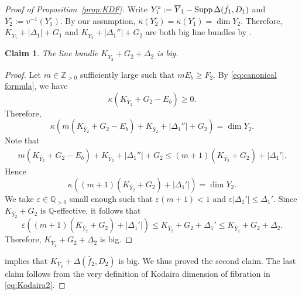 \documentclass[11pt,english]{smfart}
\theoremstyle{plain}
\newtheorem{claim}[thm]{Claim}
\theoremstyle{definition}
\theoremstyle{remark}
\numberwithin{equation}{subsection}
\theoremstyle{plain}
\def\ep{\varepsilon}
\newcommand{\bQ}{\mathbb{Q}}
\newcommand{\bZ}{\mathbb{Z}}
\begin{document}
\begin{proof}[Proof of Proposition~\ref{prop:KDF}]
 Write $Y_1^\circ:=\overline{Y}_1-{\rm Supp}\, \Delta(\bar{f}_1,D_1)$ and $Y_2^\circ:=v^{-1}(Y_1^\circ)$.  By our assumption, $\bar{\kappa}(Y_2^\circ)=\bar{\kappa}(Y_1^\circ)=\dim Y_2$.  Therefore, 
 $
K_{\overline{Y}_1}+|\Delta_1|+G_1
$  and  $
 K_{\overline{Y}_2}+|\Delta_1''|+G_2
 $ are both   big line bundles by \cite[Lemma 3]{NWY13}.
\begin{claim}\label{claim:big}
	The line bundle 
 $
K_{\overline{Y}_2}+ G_2+\Delta_2
$  is big.
\end{claim}
\begin{proof}
	Let $m\in \bZ_{>0}$ sufficiently large such that $m E_b\geq F_2$.  By \eqref{eq:canonical formula}, we have
	$$
	\kappa(	K_{\overline{Y}_{2}} + G_{2}-E_b)\geq 0. 
	$$
	Therefore,
	$$
	\kappa(	m(K_{\overline{Y}_{2}} + G_{2}-E_b)+ K_{\overline{Y}_2}+|\Delta_1''|+G_2 )=\dim Y_2.
	$$
	Note that
	\begin{align*}
		m(K_{\overline{Y}_{2}} + G_{2}-E_b)+ K_{\overline{Y}_2}+|\Delta_1''|+G_2\leq 	(m+1)(K_{\overline{Y}_{2}} + G_2)  +|\Delta_1'|.
	\end{align*}
Hence 
$$
\kappa(		(m+1)(K_{\overline{Y}_{2}} + G_2)  +|\Delta_1'|)=\dim Y_2.
$$
We take $\ep\in \bQ_{>0}$ small enough such that  $\ep(m+1)<1$ and $\ep|\Delta_1'|\leq \Delta_1'$. Since $K_{\overline{Y}_{2}} + G_2$ is $\bQ$-effective, it follows that
$$
\ep((m+1)(K_{\overline{Y}_{2}} + G_2)  +|\Delta_1'|)\leq K_{\overline{Y}_{2}} + G_2+\Delta_1'\leq K_{\overline{Y}_{2}} + G_2+\Delta_2.
$$
Therefore, $K_{\overline{Y}_{2}} + G_2+\Delta_2$ is big. 
\end{proof} 
 implies that  $ K_{\overline{Y}_2}+\Delta(\bar{f}_2,D_2)$ is big. We thus proved the second claim. The last claim follows from the very definition of Kodaira dimension of fibration in \eqref{eq:Kodaira2}. 
\end{proof}
 
\end{document}

